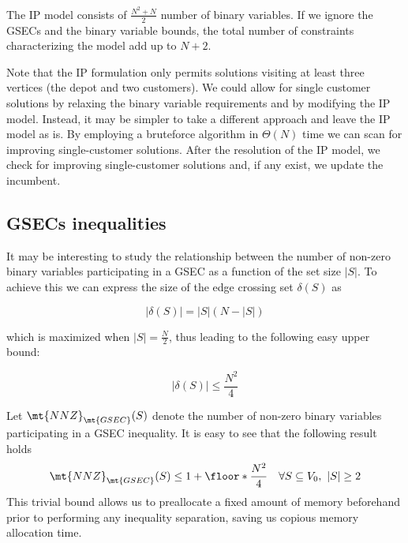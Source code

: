The IP model consists of $\frac{N^2 + N}{2}$ number of binary variables.
If we ignore the GSECs and the binary variable bounds, the total number of constraints characterizing the model add up to $N + 2$.

Note that the IP formulation only permits solutions visiting at least three vertices (the depot and two customers).
We could allow for single customer solutions by relaxing the binary variable requirements and by modifying the IP model.
Instead, it may be simpler to take a different approach and leave the IP model as is.
By employing a bruteforce algorithm in $\Theta(N)$ time we can scan for improving single-customer solutions.
After the resolution of the IP model, we check for improving single-customer solutions and, if any exist, we update the incumbent.

\subsection{GSECs inequalities}\label{sec:gsec-inequality}



It may be interesting to study the relationship between the number of non-zero binary variables participating in a GSEC as a function of the set size $|S|$.
To achieve this we can express the size of the edge crossing set $\delta(S)$ as

\begin{equation}\label{eq:delta-s-set-size}
	|\delta(S)| = |S| (N - |S|)
\end{equation}

which is maximized when $|S| = \frac{N}{2}$, thus leading to the following easy upper bound:

\begin{equation}\label{eq:delta-s-set-size-ub}
	|\delta(S)| \le \frac{N^2}{4}
\end{equation}

Let $\mt{NNZ}_{\mt{GSEC}}(S)$ denote the number of non-zero binary variables participating in a GSEC inequality.
It is easy to see that the following result holds
\begin{equation}\label{eq:gsec-nnz-ub}
	\mt{NNZ}_{\mt{GSEC}}(S) \le 1 + \floor*{\frac{N^2}{4}} \quad \forall S \subseteq V_0,\ |S| \ge 2
\end{equation}
This trivial bound allows us to preallocate a fixed amount of memory beforehand prior to performing any inequality separation, saving us copious memory allocation time.

